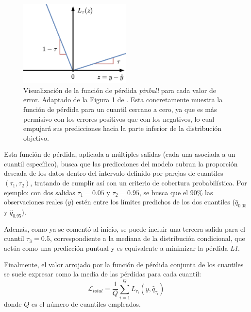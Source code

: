 \begin{itemize}
    \begin{figure}[htbp]
        \centering
        \includegraphics[width=0.5\textwidth]{capitulos/cap_04/imagenes/pinball_loss.png}
        \caption[
            Visualización de la función de pérdida \textit{pinball} para cada valor de error.
        ]{
            Visualización de la función de pérdida \textit{pinball} para cada valor de error.
            Adaptado de la Figura 1 de \cite{romano2019}.
            Esta concretamente muestra la función de pérdida para un cuantil cercano a cero, ya que es más permisivo con los errores positivos que con los negativos, lo cual empujará sus predicciones hacia la parte inferior de la distribución objetivo.
        } 
        \label{fig:pinball_loss}
    \end{figure}

    
    Esta función de pérdida, aplicada a múltiples salidas (cada una asociada a un cuantil específico), busca que las predicciones del modelo cubran la proporción deseada de los datos dentro del intervalo definido por parejas de cuantiles $(\tau_1, \tau_2)$, tratando de cumplir así con un criterio de cobertura probabilística. Por ejemplo: con dos salidas $\tau_1 = 0.05$ y $\tau_2 = 0.95$, se busca que el 90\% las observaciones reales ($y$) estén entre los límites predichos de los dos cuantiles ($\hat{q}_{0.05}$ y $\hat{q}_{0.95}$).

    Además, como ya se comentó al inicio, se puede incluir una tercera salida para el cuantil $\tau_3 = 0.5$, correspondiente a la mediana de la distribución condicional, que actúa como una predicción puntual y es equivalente a minimizar la pérdida \textit{L1}.

    Finalmente, el valor arrojado por la función de pérdida conjunta de los cuantiles se suele expresar como la media de las pérdidas para cada cuantil:
    $$
    \mathcal{L}_{total} = \frac{1}{Q} \sum_{i=1}^Q L_{\tau_i} (y, \hat{q}_{\tau_i})
    $$
    donde $Q$ es el número de cuantiles empleados.

\end{itemize}


